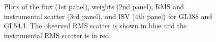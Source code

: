 \begin{figure}
    \hspace{-2cm}
	\captionsetup{width=.8\textwidth}
    \caption{Plots of the flux (1st panel), weights (2nd panel), RMS and instrumental scatter (3rd panel), and ISV (4th panel) for GL388 and GL54.1. The observed RMS scatter is shown in blue and the instrumental RMS scatter is in red.}
    \label{figordercurve}
\end{figure}


